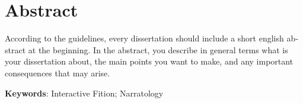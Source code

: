 
\chapter*{Abstract}


\begin{otherlanguage}{english}
    According to the guidelines, every dissertation should include a short english abstract at the beginning. In the abstract, you describe in general terms what is your dissertation about, the main points you want to make, and any important consequences that may arise.

	\textbf{Keywords}: Interactive Fition; Narratology
\end{otherlanguage}
